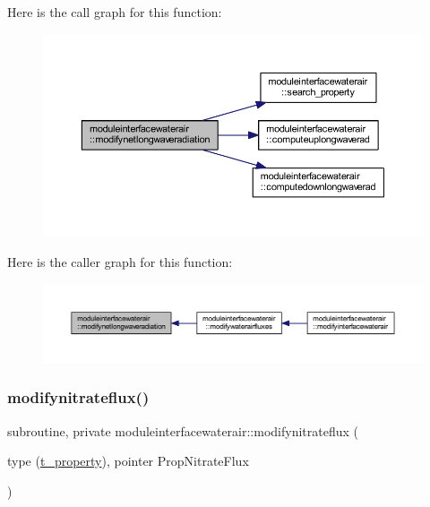 Here is the call graph for this function\+:\nopagebreak
\begin{figure}[H]
\begin{center}
\leavevmode
\includegraphics[width=350pt]{namespacemoduleinterfacewaterair_a446911b7d3595fa04059369d70ebf75e_cgraph}
\end{center}
\end{figure}
Here is the caller graph for this function\+:\nopagebreak
\begin{figure}[H]
\begin{center}
\leavevmode
\includegraphics[width=350pt]{namespacemoduleinterfacewaterair_a446911b7d3595fa04059369d70ebf75e_icgraph}
\end{center}
\end{figure}
\mbox{\label{namespacemoduleinterfacewaterair_ac260263b243a28d2d9eb0dce7188d3b0}} 
\subsubsection{\texorpdfstring{modifynitrateflux()}{modifynitrateflux()}}
{\footnotesize\ttfamily subroutine, private moduleinterfacewaterair\+::modifynitrateflux (\begin{DoxyParamCaption}\item[{type (\mbox{\hyperlink{structmoduleinterfacewaterair_1_1t__property}{t\+\_\+property}}), pointer}]{Prop\+Nitrate\+Flux }\end{DoxyParamCaption})\hspace{0.3cm}{\ttfamily [private]}}


